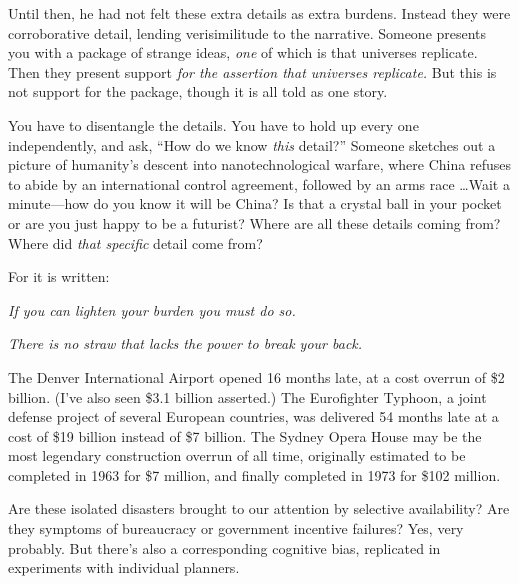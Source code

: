 {
 Until then, he had not felt these extra details as extra burdens.
Instead they were corroborative detail, lending verisimilitude to the
narrative. Someone presents you with a package of strange ideas,
\textit{one} of which is that universes replicate. Then they present
support \textit{for the assertion that universes replicate.} But this
is not support for the package, though it is all told as one story.}

{
 You have to disentangle the details. You have to hold up every one
independently, and ask, ``How do we know \textit{this}
detail?'' Someone sketches out a picture of
humanity's descent into nanotechnological warfare,
where China refuses to abide by an international control agreement,
followed by an arms race \ldots Wait a minute---how do you know it will
be China? Is that a crystal ball in your pocket or are you just happy
to be a futurist? Where are all these details coming from? Where did
\textit{that specific} detail come from?}

{
 For it is written:}

{
 \textit{If you can lighten your burden you must do so.}}

{
 \textit{There is no straw that lacks the power to break your
back.}}

\myendsectiontext


\bigskip


{
 The Denver International Airport opened 16 months late, at a cost
overrun of \$2 billion. (I've also seen \$3.1 billion
asserted.) The Eurofighter Typhoon, a joint defense project of several
European countries, was delivered 54 months late at a cost of \$19
billion instead of \$7 billion. The Sydney Opera House may be the most
legendary construction overrun of all time, originally estimated to be
completed in 1963 for \$7 million, and finally completed in 1973 for
\$102 million. }

{
 Are these isolated disasters brought to our attention by selective
availability? Are they symptoms of bureaucracy or government incentive
failures? Yes, very probably. But there's also a
corresponding cognitive bias, replicated in experiments with individual
planners.}

